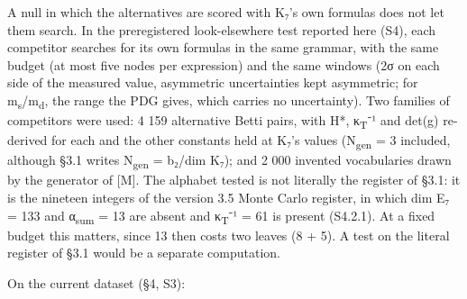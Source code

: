 \documentclass[11pt,a4paper]{article}
\begin{document}
A null in which the alternatives are scored with K₇'s own formulas does not let them search. In the preregistered look-elsewhere test reported here (S4), each competitor searches for its own formulas in the same grammar, with the same budget (at most five nodes per expression) and the same windows (2σ on each side of the measured value, asymmetric uncertainties kept asymmetric; for m\textsubscript{s}/m\textsubscript{d}, the range the PDG gives, which carries no uncertainty). Two families of competitors were used: 4 159 alternative Betti pairs, with H*, κ\textsubscript{T}⁻¹ and det(g) re-derived for each and the other constants held at K₇'s values (N\textsubscript{gen} = 3 included, although §3.1 writes N\textsubscript{gen} = b₂/dim K₇); and 2 000 invented vocabularies drawn by the generator of {[}M{]}. The alphabet tested is not literally the register of §3.1: it is the nineteen integers of the version 3.5 Monte Carlo register, in which dim E₇ = 133 and α\textsubscript{sum} = 13 are absent and κ\textsubscript{T}⁻¹ = 61 is present (S4.2.1). At a fixed budget this matters, since 13 then costs two leaves (8 + 5). A test on the literal register of §3.1 would be a separate computation.

On the current dataset (§4, S3):
\end{document}
